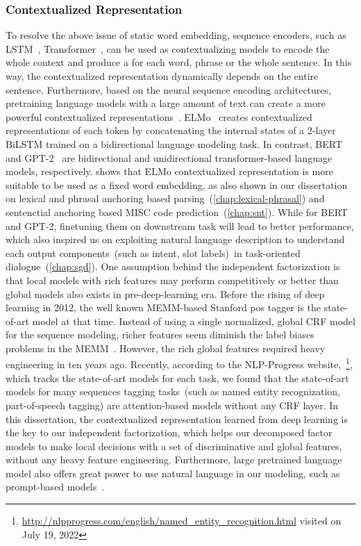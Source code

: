 \subsubsection{Contextualized Representation}
\label{sssec:bg:contextualizing}
To resolve the above issue of static word embedding, sequence
encoders, such as LSTM~\citep{hochreiter97lstm},
Transformer~\citep{NIPS2017_7181}, can be used as contextualizing
models to encode the whole context and produce a  for each word, phrase or the whole sentence. In this
way, the contextualized representation dynamically depends on the
entire sentence. Furthermore, based on the neural sequence encoding
architectures, pretraining language models with a large amount of text
can create a more powerful contextualized
representations~\citep{ethayarajh2019contextual}. ELMo~\cite{elmo}
creates contextualized representations of each token by concatenating
the internal states of a 2-layer BiLSTM trained on a bidirectional
language modeling task. In contrast, BERT~\citep{devlin2019bert} and
GPT-2~\citep{radford2018improving} are bidirectional and
unidirectional transformer-based language models,
respectively. \citet{peters2019tune} shows that ELMo contextualized
representation is more suitable to be used as a fixed word embedding,
as also shown in our dissertation on lexical and phrasal anchoring
based parsing~(\autoref{chap:lexical-phrasal}) and sentenctial
anchoring based MISC code prediction~(\autoref{chap:snt}). While for
BERT and GPT-2, finetuning them on downstream task will lead to better
performance, which also inspired us on exploiting natural language
description to understand each output components~(such as intent, slot
labels)~in task-oriented dialogue~(\autoref{chap:sgd}).  One
assumption behind the independent factorization is that local models
with rich features may perform competitively or better than global
models also exists in pre-deep-learning era. Before the rising of deep
learning in 2012, the well known MEMM-based Stanford pos tagger is the
state-of-art model at that time. Instead of using a single normalized,
global CRF model for the sequence modeling, richer features seem
diminish the label biases problems in the
MEMM~\citep{toutanvoa2000enriching,toutanova2003feature}. However, the
rich global features required heavy engineering in ten years ago.
Recently, according to the NLP-Progress
website,~\footnote{\url{http://nlpprogress.com/english/named_entity_recognition.html}
  visited on July 19, 2022}, which tracks the state-of-art models for
each task, we found that the state-of-art models for many sequences
tagging tasks~(such as named entity recognization, part-of-speech
tagging) are attention-based models without any CRF layer. In this
dissertation, the contextualized representation learned from deep
learning is the key to our independent factorization, which helps our
decomposed factor models to make local decisions with a set of
discriminative and global features, without any heavy feature
engineering. Furthermore, large pretrained language model also offers
great power to use natural language in our modeling, such as
prompt-based models~\citep{shin2020autoprompt,liu2021pre}.

